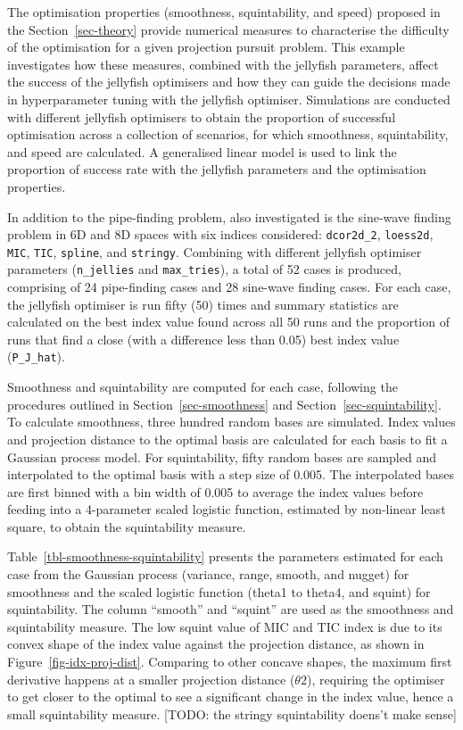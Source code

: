 \documentclass[
  number,
  preprint,
  3p]{elsarticle}
\begin{document}
The optimisation properties (smoothness, squintability, and speed)
proposed in the Section~\ref{sec-theory} provide numerical measures to
characterise the difficulty of the optimisation for a given projection
pursuit problem. This example investigates how these measures, combined
with the jellyfish parameters, affect the success of the jellyfish
optimisers and how they can guide the decisions made in hyperparameter
tuning with the jellyfish optimiser. Simulations are conducted with
different jellyfish optimisers to obtain the proportion of successful
optimisation across a collection of scenarios, for which smoothness,
squintability, and speed are calculated. A generalised linear model is
used to link the proportion of success rate with the jellyfish
parameters and the optimisation properties.

In addition to the pipe-finding problem, also investigated is the
sine-wave finding problem in 6D and 8D spaces with six indices
considered: \texttt{dcor2d\_2}, \texttt{loess2d}, \texttt{MIC},
\texttt{TIC}, \texttt{spline}, and \texttt{stringy}. Combining with
different jellyfish optimiser parameters (\texttt{n\_jellies} and
\texttt{max\_tries}), a total of 52 cases is produced, comprising of 24
pipe-finding cases and 28 sine-wave finding cases. For each case, the
jellyfish optimiser is run fifty (50) times and summary statistics are
calculated on the best index value found across all 50 runs and the
proportion of runs that find a close (with a difference less than 0.05)
best index value (\texttt{P\_J\_hat}).

Smoothness and squintability are computed for each case, following the
procedures outlined in Section~\ref{sec-smoothness} and
Section~\ref{sec-squintability}. To calculate smoothness, three hundred
random bases are simulated. Index values and projection distance to the
optimal basis are calculated for each basis to fit a Gaussian process
model. For squintability, fifty random bases are sampled and
interpolated to the optimal basis with a step size of 0.005. The
interpolated bases are first binned with a bin width of 0.005 to average
the index values before feeding into a 4-parameter scaled logistic
function, estimated by non-linear least square, to obtain the
squintability measure.

Table~\ref{tbl-smoothness-squintability} presents the parameters
estimated for each case from the Gaussian process (variance, range,
smooth, and nugget) for smoothness and the scaled logistic function
(theta1 to theta4, and squint) for squintability. The column ``smooth''
and ``squint'' are used as the smoothness and squintability measure. The
low squint value of MIC and TIC index is due to its convex shape of the
index value against the projection distance, as shown in
Figure~\ref{fig-idx-proj-dist}. Comparing to other concave shapes, the
maximum first derivative happens at a smaller projection distance
(\(\theta2\)), requiring the optimiser to get closer to the optimal to
see a significant change in the index value, hence a small squintability
measure. {[}TODO: the stringy squintability doens't make sense{]}
\end{document}
